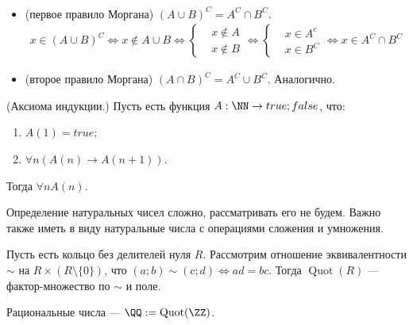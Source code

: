 \documentclass[12pt,a4paper]{article}
\DeclareMathOperator{\Quot}{Quot}
\begin{document}
    \begin{corollary*}\
        \begin{itemize}
            \item (первое правило Моргана) $(A\cup B)^C = A^C \cap B^C$.
                \begin{align*}
                    x\in (A\cup B)^C \Leftrightarrow
                    x \notin A \cup B \Leftrightarrow
                    \left\{ \begin{aligned}
                        &x \notin A\\
                        &x \notin B
                    \end{aligned}\right. \Leftrightarrow
                    \left\{ \begin{aligned}
                        &x \in A^c\\
                        &x \in B^C
                    \end{aligned} \right. \Leftrightarrow
                    x \in A^C \cap B^C
                \end{align*}
            \item (второе правило Моргана) $(A\cap B)^C = A^C \cup B^C$. Аналогично.
        \end{itemize}
    \end{corollary*}

    \begin{definition}
        (Аксиома индукции.) Пусть есть функция $A: \NN \to {true;false}$, что:
        \begin{enumerate}
            \item $A(1)=true$;
            \item $\forall n (A(n) \rightarrow A(n+1))$.
        \end{enumerate}
        Тогда $\forall n A(n)$.
    \end{definition}

    Определение натуральных чисел сложно, рассматривать его не будем. Важно также иметь в виду натуральные числа с операциями сложения и умножения.

    \begin{definition}
        Пусть есть кольцо без делителей нуля $R$. Рассмотрим отношение эквивалентности $\sim$ на $R \times (R\setminus \{0\})$, что $(a; b) \sim (c; d) \Leftrightarrow ad = bc$. Тогда $\Quot(R)$ --- фактор-множество по $\sim$ и поле.
    \end{definition}

    \begin{definition}
        Рациональные числа --- $\QQ := \Quot(\ZZ)$.
    \end{definition}
\end{document}
